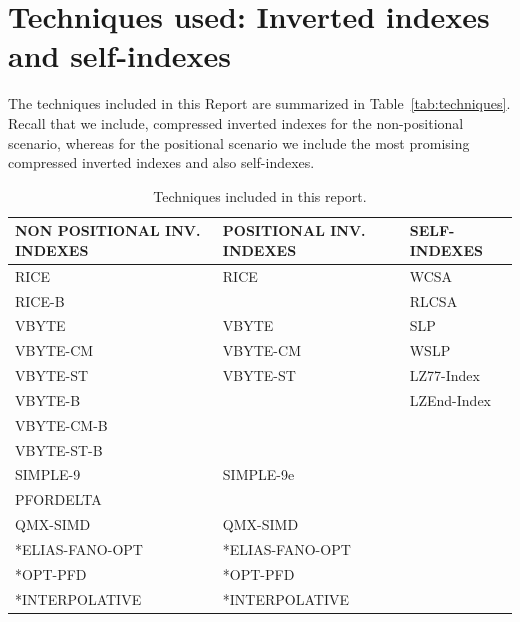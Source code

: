 \documentclass[review]{elsarticle}
\begin{document}
\section{Techniques used: Inverted indexes and self-indexes}
The techniques included  in this Report are summarized in Table~\ref{tab:techniques}. Recall that we include, compressed inverted indexes for the non-positional scenario, whereas for the positional scenario we include the most promising compressed inverted indexes and also self-indexes.

\begin{table}[htbp]
	\caption{Techniques included in this report.}
	\begin{center}
	
	\scriptsize
	\begin{tabular}{|l|l|l|}
	\hline
	\textbf{NON POSITIONAL INV. INDEXES} & \textbf{POSITIONAL INV. INDEXES} & \textbf{SELF-INDEXES} \\ \hline
	\hline
	\hline
	RICE                      &  RICE                    & WCSA        \\ \hline
	RICE-B                    &                          & RLCSA       \\ \hline
	VBYTE                     &  VBYTE                   & SLP         \\ \hline
	VBYTE-CM                  &  VBYTE-CM                & WSLP        \\ \hline
	VBYTE-ST                  &  VBYTE-ST                & LZ77-Index  \\ \hline
	VBYTE-B                   &                          & LZEnd-Index \\ \hline
	VBYTE-CM-B                &                          &             \\ \hline
	VBYTE-ST-B                &                          &             \\ \hline
	SIMPLE-9                  &  SIMPLE-9e               &             \\ \hline
	PFORDELTA                 &                          &             \\ \hline
	QMX-SIMD                  &  QMX-SIMD                &             \\ \hline
	*ELIAS-FANO-OPT           &  *ELIAS-FANO-OPT         &             \\ \hline
	*OPT-PFD                  &  *OPT-PFD                &             \\ \hline
	*INTERPOLATIVE            &  *INTERPOLATIVE          &             \\ \hline

\end{tabular}
\end{center}
\end{table}
\end{document}
